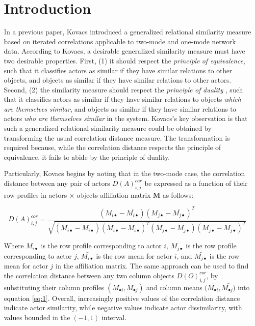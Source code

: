 \documentclass[a4paper,fleqn]{cas-sc}
\begin{document}
\section{Introduction}
In a previous paper, Kovacs \citeyearpar{kovacs2010} introduced a generalized relational similarity measure based on iterated correlations applicable to two-mode and one-mode network data. According to Kovacs, a desirable generalized similarity measure must have two desirable properties. First, (1) it should respect the \textit{principle of equivalence}, such that it classifies actors as similar if they have similar relations to other objects, and objects as similar if they have similar relations to other actors. Second, (2) the similarity measure should respect the \textit{principle of duality} \citep{breiger1974}, such that it classifies actors as similar if they have similar relations to objects \textit{which are themselves similar}, and objects as similar if they have similar relations to actors \textit{who are themselves similar} in the system. Kovacs's key observation is that such a generalized relational similarity measure could be obtained by transforming the usual correlation distance measure. The transformation is required because, while the correlation distance respects the principle of equivalence, it fails to abide by the principle of duality. 

Particularly, Kovacs begins by noting that in the two-mode case, the correlation distance between any pair of actors $D(A)^{cor}_{i,j}$ be expressed as a function of their row profiles in actors $\times$ objects affiliation matrix $\mathbf{M}$ as follows:

\begin{equation}
    D(A)^{cor}_{i,j} = 
    \frac{
    (M_{i\bullet} - \bar{M_{i\bullet}})
    (M_{j\bullet} - \bar{M_{j\bullet}})^T
    }
    {
    \sqrt{
    (M_{i\bullet} - \bar{M_{i\bullet}})
    (M_{i\bullet} - \bar{M_{i\bullet}})^T
    (M_{j\bullet} - \bar{M_{j\bullet}})
    (M_{j\bullet} - \bar{M_{j\bullet}})^T
        }
    }
    \label{eq:1}
\end{equation}

Where $M_{i\bullet}$ is the row profile corresponding to actor $i$, $M_{j\bullet}$ is the row profile corresponding to actor $j$, $\bar{M_{i\bullet}}$ is the row mean for actor $i$, and $\bar{M_{j\bullet}}$ is the row mean for actor $j$ in the affiliation matrix. The same approach can be used to find the correlation distance between any two column objects $D(O)^{cor}_{i, j}$, by substituting their column profiles $(M_{\bullet i}, M_{\bullet j})$ and column means $(\bar{M_{\bullet i}}, \bar{M_{\bullet j})}$ into equation \ref{eq:1}. Overall, increasingly positive values of the correlation distance indicate actor similarity, while negative values  indicate actor dissimilarity, with values bounded in the $(-1, 1)$ interval.
\end{document}
